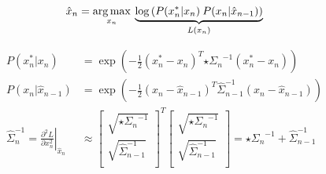\begin{algorithm}
\begin{equation*}
\begin{aligned}
\hat{x}_n &= \operatorname*{arg\,max}_{x_n} \: \underbrace{\log \left( P(x_n^*|x_n) \: P(x_n |\hat{x}_{n - 1}) \right)}_{L(x_n)}    
\\
\end{aligned}
\end{equation*}

\begin{equation*}
\begin{aligned}
P(x_n^* | x_n) &= \exp \left( -\tfrac{1}{2}(x_n^* - x_n )^T {\star{\Sigma}_n}^{-1}(x_n^* - x_n )\right)
\\
P(x_n |\hat{x}_{n - 1}) &= 
\exp \left( -\tfrac{1}{2} (x_n - \hat{x}_{n - 1} )^T \hat{\Sigma}_{n - 1}^{-1} (x_n - \hat{x}_{n - 1} )\right)
\\
\hat{\Sigma}_n^{-1} = 
\left.\tfrac{\partial^2 L}{\partial x_n^2}\right|_{\hat{x}_n} &\approx 
\left[
    \begin{array}{cc}
        \sqrt{{\star{\Sigma}_n}^{-1}} \\
        \sqrt{\hat{\Sigma}_{n - 1}^{-1}} \\
    \end{array}
\right]^T
\left[
    \begin{array}{c}
        \sqrt{{\star{\Sigma}_n}^{-1}} \\
        \sqrt{\hat{\Sigma}_{n - 1}^{-1}} \\
    \end{array}
\right]
= {\star{\Sigma}_n}^{-1} + \hat{\Sigma}_{n-1}^{-1}
\end{aligned}
\end{equation*}
\caption{
% 
% 
\emph{Split} cumulative regression -- Kalman Filter (KF)
% 
% 
}
\label{tab:interframe}
\label{tab:kf-like}
\end{algorithm}